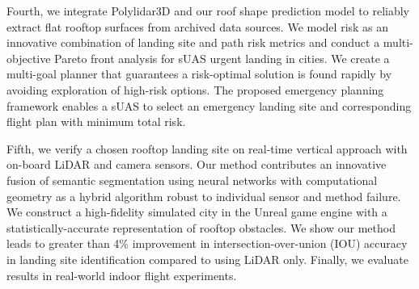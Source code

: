 Fourth, we integrate Polylidar3D and our roof shape prediction model to reliably extract flat rooftop surfaces from archived data sources.  We model risk as an innovative combination of landing site and path risk metrics and conduct a multi-objective Pareto front analysis for sUAS urgent landing in cities. We create a multi-goal planner that guarantees a risk-optimal solution is found rapidly by avoiding exploration of high-risk options. The proposed emergency planning framework enables a sUAS to select an emergency landing site and corresponding flight plan with minimum total risk.

Fifth, we verify a chosen rooftop landing site on real-time vertical approach with on-board LiDAR and camera sensors. Our method contributes an innovative fusion of semantic segmentation using neural networks with computational geometry as a hybrid algorithm robust to individual sensor and method failure.  We construct a high-fidelity simulated city in the Unreal game engine with a statistically-accurate representation of rooftop obstacles. We show our method leads to greater than 4\% improvement in intersection-over-union (IOU) accuracy in landing site identification compared to using LiDAR only. Finally, we evaluate results in real-world indoor flight experiments.

